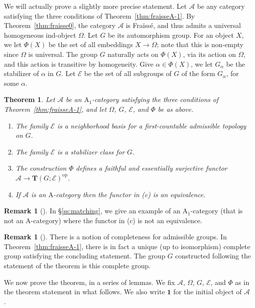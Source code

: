 \documentclass[12pt]{amsart}
\numberwithin{equation}{section}
\newtheorem{theorem}[equation]{Theorem}
\theoremstyle{definition}
\newtheorem{rmk}[equation]{Remark}
\newenvironment{remark}[1][]{\begin{rmk}[#1] \pushQED{\qed}}{\popQED \end{rmk}}
\newcommand{\cA}{\mathcal{A}}
\newcommand{\rA}{\mathrm{A}}
\newcommand{\sE}{\mathscr{E}}
\newcommand{\bT}{\mathbf{T}}
\newcommand{\op}{\mathrm{op}}
\newcommand{\bone}{\mathbf{1}}
\begin{document}
We will actually prove a slightly more precise statement. Let $\cA$ be any category satisfying the three conditions of Theorem~\ref{thm:fraisseA-1}. By Theorem~\ref{thm:fraisse0}, the category $\cA$ is Fra\"iss\'e, and thus admits a universal homogeneous ind-object $\Omega$. Let $G$ be its automorphism group. For an object $X$, we let $\Phi(X)$ be the set of all embeddings $X \to \Omega$; note that this is non-empty since $\Omega$ is universal. The group $G$ naturally acts on $\Phi(X)$, via its action on $\Omega$, and this action is transitive by homogeneity. Give $\alpha \in \Phi(X)$, we let $G_{\alpha}$ be the stabilizer of $\alpha$ in $G$. Let $\sE$ be the set of all subgroups of $G$ of the form $G_{\alpha}$, for some $\alpha$.

\begin{theorem} \label{thm:fraisseA-2}
Let $\cA$ be an $\rA_1$-category satisfying the three conditions of Theorem~\ref{thm:fraisseA-1}, and let $\Omega$, $G$, $\sE$, and $\Phi$ be as above.
\begin{enumerate}
\item The family $\sE$ is a neighborhood basis for a first-countable admissible topology on $G$.
\item The family $\sE$ is a stabilizer class for $G$.
\item The construction $\Phi$ defines a faithful and essentially surjective functor $\cA \to \bT(G; \sE)^{\op}$.
\item If $\cA$ is an $\rA$-category then the functor in (c) is an equivalence.
\end{enumerate}
\end{theorem}

\begin{remark}
In \S \ref{ss:matching}, we give an example of an $\rA_1$-category (that is not an $\rA$-category) where the functor in (c) is not an equivalence.
\end{remark}

\begin{remark} \label{rmk:complete}
There is a notion of completeness for admissible groups. In Theorem~\ref{thm:fraisseA-1}, there is in fact a unique (up to isomorphism) complete group satisfying the concluding statement. The group $G$ constructed following the statement of the theorem is this complete group.
\end{remark}

We now prove the theorem, in a series of lemmas. We fix $\cA$, $\Omega$, $G$, $\sE$, and $\Phi$ as in the theorem statement in what follows. We also write $\bone$ for the initial object of $\cA$.
\end{document}
